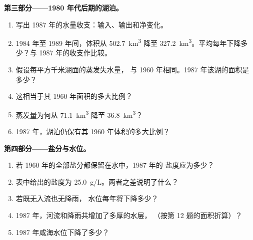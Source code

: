 \begin{problem}
\medskip
\noindent\textbf{第三部分——1980 年代后期的湖泊。}
\begin{enumerate}[resume]
  \item 写出 1987 年的水量收支：输入、输出和净变化。
  \item 1984 年至 1989 年间，体积从 \qty{502.7}{km^3} 降至
        \qty{327.2}{km^3}。平均每年下降多少？与
        1987 年的收支作比较。
  \item 假设每平方千米湖面的蒸发失水量，
        与 1960 年相同。1987 年该湖的面积是多少？
  \item 这相当于其 1960 年面积的多大比例？
  \item 蒸发量为何从 \qty{71.1}{km^3} 降至
        \qty{36.8}{km^3}？
  \item 1987 年，湖泊仍保有其 1960 年体积的多大比例？
\end{enumerate}

\medskip
\noindent\textbf{第四部分——盐分与水位。}
\begin{enumerate}[resume]
  \item 若 1960 年的全部盐分都保留在水中，1987 年的
        盐度应为多少？
  \item 表中给出的盐度为 \qty{25.0}{g/L}。两者之差说明了什么？
  \item 若既无入流也无降雨，
        水位每年将下降多少？
  \item 1987 年，河流和降雨共增加了多厚的水层，
        （按第 12 题的面积折算）？
  \item 1987 年咸海水位下降了多少？
\end{enumerate}
\end{problem}
